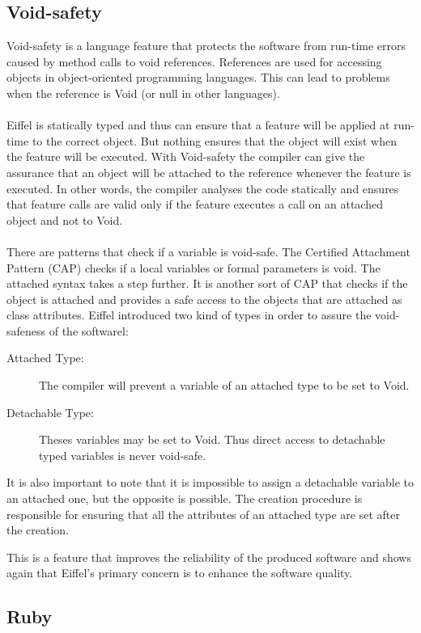 \documentclass[12pt,a4paper,twocolumn]{article}
\begin{document}
\subsection{Void-safety}
Void-safety is a language feature that protects the software from run-time errors caused by method calls to void references. References are used for accessing objects in object-oriented programming languages. This can lead to problems when the reference is Void (or null in other languages).
\\
\\
Eiffel is statically typed and thus can ensure that a feature will be applied at run-time to the correct object. But nothing ensures that the object will exist when the feature will be executed. With Void-safety the compiler can give the assurance that an object will be attached to the reference whenever the feature is executed. In other words, the compiler analyses the code statically and ensures that feature calls are valid only if the feature executes a call on an attached object and not to Void.
\\
\\
There are patterns that check if a variable is void-safe. The Certified Attachment Pattern (CAP) checks if a local variables or formal parameters is void. The attached syntax takes a step further. It is another sort of CAP that checks if the object is attached and provides a safe access to the objects that are attached as class attributes. Eiffel introduced two kind of types in order to assure the void-safeness of the softwarel:
\begin{description}
\item[Attached Type: ] The compiler will prevent a variable of an attached type to be set to Void.
\item[Detachable Type: ] Theses variables may be set to Void. Thus direct access to detachable typed variables is never void-safe.%
\end{description}
It is also important to note that it is impossible to assign a detachable variable to an attached one, but the opposite is possible. The creation procedure is responsible for ensuring that all the attributes of an attached type are set after the creation. 

This is a feature that improves the reliability of the produced software and shows again that Eiffel's primary concern is to enhance the software quality.
\subsection{Ruby}
\end{document}
